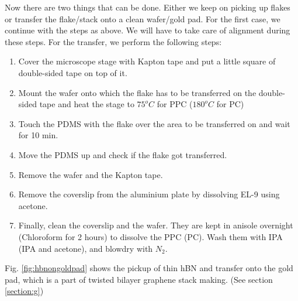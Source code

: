 Now there are two things that can be done. Either we keep on picking up flakes or transfer the flake/stack onto a clean wafer/gold pad. For the first case, we continue with the steps as above. We will have to take care of alignment during these steps. For the transfer, we perform the following steps:
\begin{enumerate}
	\item Cover the microscope stage with Kapton tape and put a little square of double-sided tape on top of it.
	\item Mount the wafer onto which the flake has to be transferred on the double-sided tape and heat the stage to $75 ^o C$ for PPC ($180 ^oC$ for PC)
	\item Touch the PDMS with the flake over the area to be transferred on and wait for 10 min.
	\item Move the PDMS up and check if the flake got transferred.
	\item Remove the wafer and the Kapton tape.
	\item Remove the coverslip from the aluminium plate by dissolving EL-9 using acetone.
	\item Finally, clean the coverslip and the wafer. They are kept in anisole overnight (Chloroform for 2 hours) to dissolve the PPC (PC). Wash them with IPA (IPA and acetone), and blowdry with $N_2$.
\end{enumerate}

Fig. \ref{fig:hbnongoldpad} shows the pickup of thin hBN and transfer onto the gold pad, which is a part of twisted bilayer graphene stack making. (See section \ref{section:g})

